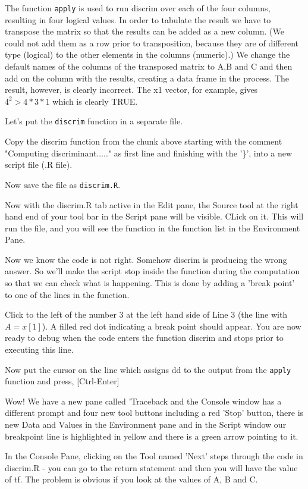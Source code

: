 \documentclass[titlepage]{book}\usepackage{knitr}
\begin{document}
The function \texttt{apply} is used to run discrim over each of the four columns, resulting in four logical values. In order to tabulate the result we have to transpose the matrix so that the results can be added as a new column. (We could not add them as a row prior to transposition, because they are of different type (logical) to the other elements in the columns (numeric).) We change the default names of the columns of the transposed matrix to A,B and C  and then add on the column with the results, creating a data frame in the process. The result, however, is clearly incorrect. The x1 vector, for example, gives $4^2  > 4*3*1$ which is clearly TRUE.


Let's put the \texttt{discrim} function in a separate file.

Copy the discrim function from the chunk above starting with the comment "Computing discriminant....."  as first line and finishing with the '\}', into a new script file (.R file).

Now save the file as \texttt{discrim.R}.

Now with the discrim.R tab active in the Edit pane, the Source tool at the right hand end of your tool bar in the Script pane will be visible. CLick on it. This will run the file, and you will see the function in the function list in the Environment Pane. 

 
Now we know the code is not right. Somehow discrim is producing the wrong answer.  So we'll make the script stop inside the function during the computation so that we can check what is happening.  This is done by adding a 'break point' to one of the lines in the function.

Click to the left of the number 3 at the left hand side of Line 3 (the line with $A = x[1]$). A filled red dot indicating a break point should appear. You are now ready to debug when the code enters the function discrim and stops prior to executing this line.

Now put the cursor on the line which assigns dd to the output from the \texttt{apply} function and press, [Ctrl-Enter]

 Wow! We have a new pane called 'Traceback and the Console window has a different prompt and four new tool buttons including a red 'Stop' button, there is new Data and Values in the Environment pane and in the Script window our breakpoint line is highlighted in yellow and there is a green arrow pointing to it.
 
In the Console Pane, clicking on the Tool named 'Next' steps through the code in discrim.R - you can go to the return statement and then you will have the value of tf.  The problem is obvious if you look at the values of A, B and C.
\end{document}
